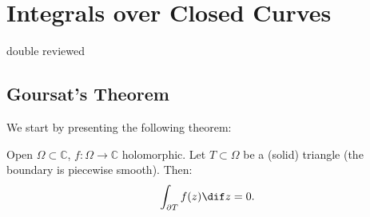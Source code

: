 \setcounter{section}{0}
\setcounter{theorem}{0}



\section{Integrals over Closed Curves}
double reviewed
\subsection{Goursat's Theorem}
We start by presenting the following theorem:


\begin{theorem} \label{thm:goursat}
Open $\Omega \subset \mathbb{C}$, $f: \Omega \rightarrow \mathbb{C}$ holomorphic. Let $T\subset \Omega$ be a (solid) triangle (the boundary is piecewise smooth). Then:
\begin{align*}
    \int_{\partial T} f(z)  \dif z =0.
\end{align*}

\end{theorem}


